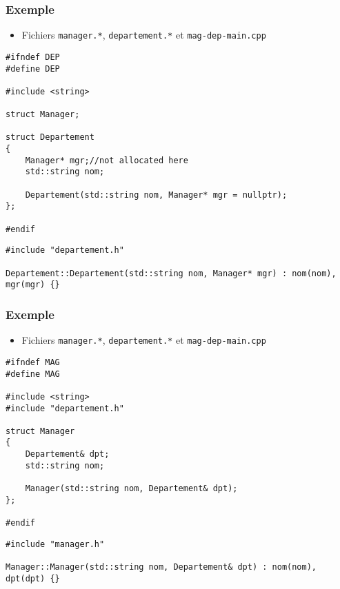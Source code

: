 \begin{frame}[containsverbatim]
\frametitle{Exemple}
\begin{itemize}
\item Fichiers \texttt{manager.*}, \texttt{departement.*} et \texttt{mag-dep-main.cpp}
\end{itemize}
\begin{lstlisting}
#ifndef DEP
#define DEP

#include <string>

struct Manager;

struct Departement
{
	Manager* mgr;//not allocated here
	std::string nom;

	Departement(std::string nom, Manager* mgr = nullptr);	
};

#endif
\end{lstlisting}
\begin{lstlisting}
#include "departement.h"

Departement::Departement(std::string nom, Manager* mgr) : nom(nom), mgr(mgr) {}
\end{lstlisting}
\end{frame}

\begin{frame}[containsverbatim]
\frametitle{Exemple}
\begin{itemize}
\item Fichiers \texttt{manager.*}, \texttt{departement.*} et \texttt{mag-dep-main.cpp}
\end{itemize}
\begin{lstlisting}
#ifndef MAG
#define MAG

#include <string>
#include "departement.h"

struct Manager
{
	Departement& dpt;
	std::string nom;
	
	Manager(std::string nom, Departement& dpt);
};

#endif
\end{lstlisting}
\begin{lstlisting}
#include "manager.h"

Manager::Manager(std::string nom, Departement& dpt) : nom(nom), dpt(dpt) {}
\end{lstlisting}
\end{frame}


